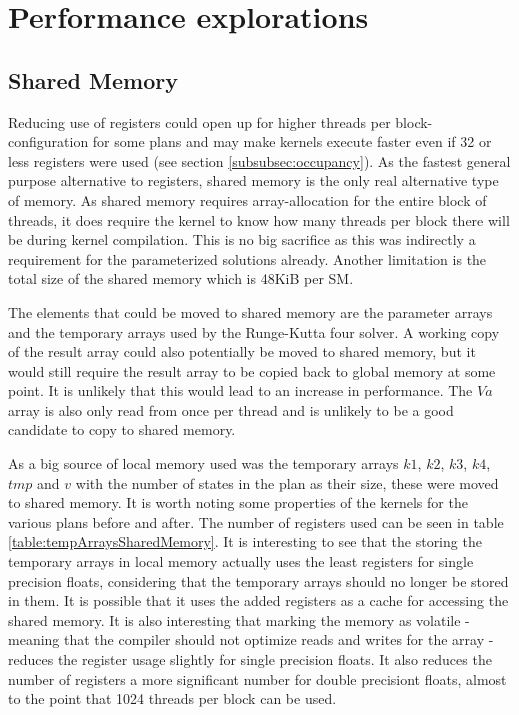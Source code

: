 \section{Performance explorations}
\subsection{Shared Memory}\label{subsec:sharedmem}
Reducing use of registers could open up for higher threads per block-configuration for some plans and may make kernels execute faster even if 32 or less registers were used (see section \ref{subsubsec:occupancy}).
As the fastest general purpose alternative to registers, shared memory is the only real alternative type of memory.
As shared memory requires array-allocation for the entire block of threads, it does require the kernel to know how many threads per block there will be during kernel compilation.
This is no big sacrifice as this was indirectly a requirement for the parameterized solutions already.
Another limitation is the total size of the shared memory which is 48KiB per SM.

The elements that could be moved to shared memory are the parameter arrays and the temporary arrays used by the Runge-Kutta four solver.
A working copy of the result array could also potentially be moved to shared memory, but it would still require the result array to be copied back to global memory at some point.
It is unlikely that this would lead to an increase in performance.
The $Va$ array is also only read from once per thread and is unlikely to be a good candidate to copy to shared memory.

As a big source of local memory used was the temporary arrays $k1$, $k2$, $k3$, $k4$, $tmp$ and $v$ with the number of states in the plan as their size, these were moved to shared memory.
It is worth noting some properties of the kernels for the various plans before and after.
The number of registers used can be seen in table \ref{table:tempArraysSharedMemory}.
It is interesting to see that the storing the temporary arrays in local memory actually uses the least registers for single precision floats, considering that the temporary arrays should no longer be stored in them.
It is possible that it uses the added registers as a cache for accessing the shared memory.
It is also interesting that marking the memory as volatile - meaning that the compiler should not optimize reads and writes for the array - reduces the register usage slightly for single precision floats.
It also reduces the number of registers a more significant number for double precisiont floats, almost to the point that 1024 threads per block can be used.

